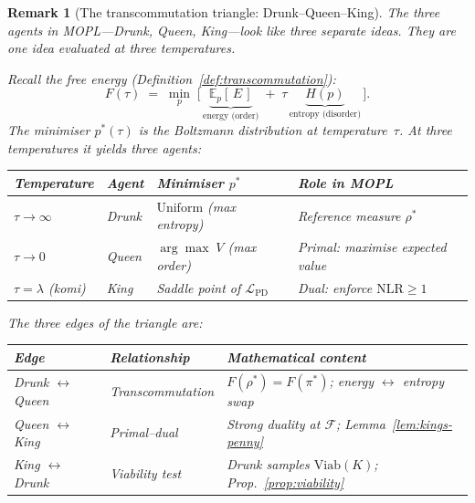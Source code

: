 \documentclass[11pt,a4paper]{article}
\newtheorem{remark}[theorem]{Remark}
\newcommand{\cL}{\mathcal{L}}
\newcommand{\cF}{\mathcal{F}}
\begin{document}
\begin{remark}[The transcommutation triangle:
  Drunk--Queen--King]%
\label{rem:transcommutation-triangle}
\color{black!60}%
The three agents in MOPL---Drunk, Queen, King---look
like three separate ideas.
They are one idea evaluated at three temperatures.

\medskip\noindent
Recall the free energy
(Definition~\ref{def:transcommutation}):
\[
  F(\tau) \;=\; \min_p \;\bigl[\,
    \underbrace{\mathbb{E}_p[\,E\,]}_{\text{energy (order)}}
    \;+\;
    \tau\,
    \underbrace{H(p)}_{\text{entropy (disorder)}}
  \,\bigr].
\]
The minimiser $p^*(\tau)$ is the Boltzmann distribution
at temperature~$\tau$.
At three temperatures it yields three agents:

\begin{center}
\small
\begin{tabular}{@{}llll@{}}
\toprule
\textbf{Temperature} &
\textbf{Agent} &
\textbf{Minimiser $p^*$} &
\textbf{Role in MOPL} \\
\midrule
$\tau \to \infty$ &
  Drunk &
  $\mathrm{Uniform}$ (max entropy) &
  Reference measure $\rho^*$ \\
$\tau \to 0$ &
  Queen &
  $\arg\max\; V$ (max order) &
  Primal: maximise expected value \\
$\tau = \lambda$ (komi) &
  King &
  Saddle point of $\cL_{\mathrm{PD}}$ &
  Dual: enforce $\mathrm{NLR} \geq 1$ \\
\bottomrule
\end{tabular}
\end{center}

\noindent
The three edges of the triangle are:

\begin{center}
\small
\begin{tabular}{@{}lll@{}}
\toprule
\textbf{Edge} &
\textbf{Relationship} &
\textbf{Mathematical content} \\
\midrule
Drunk $\leftrightarrow$ Queen &
  Transcommutation &
  $F(\rho^*) = F(\pi^*)$;\;
  energy $\leftrightarrow$ entropy swap \\
Queen $\leftrightarrow$ King &
  Primal--dual &
  Strong duality at $\cF$;\;
  Lemma~\ref{lem:kings-penny} \\
King $\leftrightarrow$ Drunk &
  Viability test &
  Drunk samples $\mathrm{Viab}(K)$;\;
  Prop.~\ref{prop:viability} \\
\bottomrule
\end{tabular}
\end{center}


\end{remark}
\end{document}
